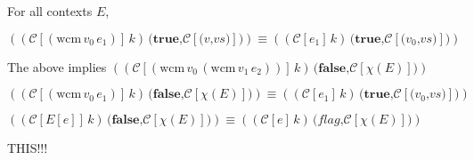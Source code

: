 \documentclass[ms,electronic,twosidetoc,letterpaper,chaptercenter,parttop]{byumsphd}
\begin{document}
\begin{theorem}
For all contexts $E$,

$((\mathcal{C}[(\mathrm{wcm}\,v_0\,e_1)]\,k)\,\textbf{(}\textbf{true}\textbf{,}\mathcal{C}[\textbf{(}v\textbf{,}vs\textbf{)}]\textbf{)})\equiv((\mathcal{C}[e_1]\,k)\,\textbf{(}\textbf{true}\textbf{,}\mathcal{C}[\textbf{(}v_0\textbf{,}vs\textbf{)}]\textbf{)})$

The above implies $((\mathcal{C}[(\mathrm{wcm}\,v_0\,(\mathrm{wcm}\,v_1\,e_2))]\,k)\,\textbf{(}\textbf{false}\textbf{,}\mathcal{C}[\chi(E)]\textbf{)})$

$((\mathcal{C}[(\mathrm{wcm}\,v_0\,e_1)]\,k)\,\textbf{(}\textbf{false}\textbf{,}\mathcal{C}[\chi(E)]\textbf{)})\equiv((\mathcal{C}[e_1]\,k)\,\textbf{(}\textbf{true}\textbf{,}\mathcal{C}[\textbf{(}v_0\textbf{,}vs\textbf{)}]\textbf{)})$

$((\mathcal{C}[E[e]]\,k)\,\textbf{(}\textbf{false}\textbf{,}\mathcal{C}[\chi(E)]\textbf{)})\equiv((\mathcal{C}[e]\,k)\,\textbf{(}\textit{flag}\textbf{,}\mathcal{C}[\chi(E)]\textbf{)})$

THIS!!!













\end{theorem}
\end{document}
